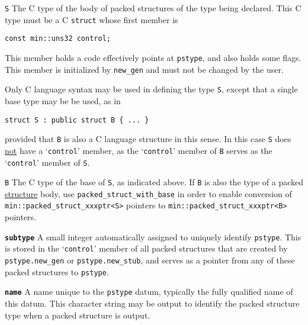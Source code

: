 \documentclass[12pt]{article}
\makeatletter
\newcommand{\ttmkey}[2]{{\tt \bf #1}\index{#1@{\tt #1}!#2}}
\newcommand{\EOL}{\penalty \exhyphenpenalty}
\newcommand{\BRACKETED}[1]{{\tt <#1>}}
\newenvironment{indpar}[1][0.3in]%
	{\begin{list}{}%
		     {\setlength{\itemsep}{0in}%
		      \setlength{\topsep}{0in}%
		      \setlength{\parsep}{1ex}%
		      \setlength{\labelwidth}{#1}%
		      \setlength{\leftmargin}{#1}%
		      \addtolength{\leftmargin}{\labelsep}}%
	 \item}%
	{\end{list}}
\newenvironment{itemlist}[1][1.2in]%
	{\begin{list}{}{\setlength{\labelwidth}{#1}%
		        \setlength{\leftmargin}{\labelwidth}%
		        \addtolength{\leftmargin}{+0.2in}%
		        \renewcommand{\makelabel}[1]{##1\hfill}}}%
	{\end{list}}
\makeatother
\begin{document}
\begin{itemlist}[0.5in]

\item[{\tt S}]
The C type of the body of packed structures of the type being
declared.  This C type must be a C \verb|struct| whose first
member is
\begin{center}
\verb|const min::uns32 control;|
\end{center}
This member holds a code effectively
points at \verb|pstype|, and also holds some flags.
This member is initialized by \verb|new_gen| and must not
be changed by the user.

Only C language syntax may be used in defining the type {\tt S},
except that a single base type may be be used, as in
\begin{indpar}\begin{verbatim}
struct S : public struct B { ... }
\end{verbatim}\end{indpar}
provided that {\tt B} is also a C language structure in this sense.
In this case {\tt S} does
\underline{not} have a `{\tt control}' member, as
the `{\tt control}' member of {\tt B} serves as
the `{\tt control}' member of {\tt S}.

\item[{\tt B}]
The C type of the base of {\tt S}, as indicated above.  If {\tt B}
is also the type of a packed \underline{structure} body, use
{\tt packed\_\EOL struct\_\EOL with\_\EOL base\BRACKETED{S,B}}
in order to enable conversion of
{\tt min::\EOL packed\_\EOL struct\_\EOL xxxptr<S>} pointers
to {\tt min::\EOL packed\_\EOL struct\_\EOL xxxptr<B>}
pointers.

\end{itemlist}

\begin{itemlist}[0.8in]

\item[\ttmkey{subtype}{in {\tt min::packed\_struct}}]
A small integer automatically assigned to uniquely identify \verb|pstype|.
This is stored in the `{\tt control}' member of all packed
structures that are created by {\tt pstype.new\_\EOL gen} or
{\tt pstype.new\_\EOL stub}, and serves as a pointer from any
of these packed structures to \verb|pstype|.

\item[\ttmkey{name}{in {\tt min::packed\_struct}}]
A name unique to the \verb|pstype| datum, typically the
fully qualified name of this datum.  This character string may
be output to identify the packed structure type when a packed structure is
output.

\end{itemlist}
\end{document}
